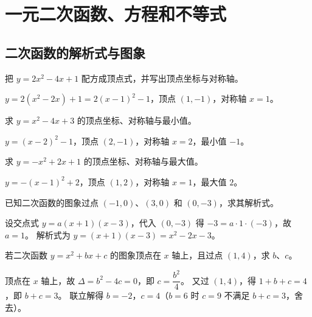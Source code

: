 \chapter{一元二次函数、方程和不等式}

\section{二次函数的解析式与图象}

\begin{problem}
把 $y=2x^2-4x+1$ 配方成顶点式，并写出顶点坐标与对称轴。
\end{problem}
\begin{solution}
$y=2(x^2-2x)+1=2(x-1)^2-1$，顶点 $(1,-1)$，对称轴 $x=1$。
\end{solution}

\begin{problem}
求 $y=x^2-4x+3$ 的顶点坐标、对称轴与最小值。
\end{problem}
\begin{solution}
$y=(x-2)^2-1$，顶点 $(2,-1)$，对称轴 $x=2$，最小值 $-1$。
\end{solution}

\begin{problem}
求 $y=-x^2+2x+1$ 的顶点坐标、对称轴与最大值。
\end{problem}
\begin{solution}
$y=-(x-1)^2+2$，顶点 $(1,2)$，对称轴 $x=1$，最大值 $2$。
\end{solution}

\begin{problem}
已知二次函数的图象过点 $(-1,0)$、$(3,0)$ 和 $(0,-3)$，求其解析式。
\end{problem}
\begin{solution}
设交点式 $y=a(x+1)(x-3)$，代入 $(0,-3)$ 得 $-3=a\cdot1\cdot(-3)$，故 $a=1$。
解析式为 $y=(x+1)(x-3)=x^2-2x-3$。
\end{solution}

\begin{problem}
若二次函数 $y=x^2+bx+c$ 的图象顶点在 $x$ 轴上，且过点 $(1,4)$，求 $b$、$c$。
\end{problem}
\begin{solution}
顶点在 $x$ 轴上，故 $\Delta=b^2-4c=0$，即 $c=\dfrac{b^2}{4}$。
又过 $(1,4)$，得 $1+b+c=4$，即 $b+c=3$。
联立解得 $b=-2$，$c=4$（$b=6$ 时 $c=9$ 不满足 $b+c=3$，舍去）。
\end{solution}

